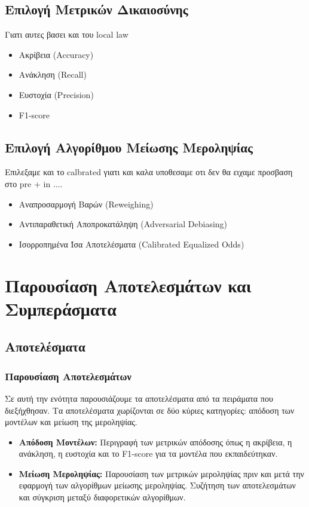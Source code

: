 \documentclass[12pt,twoside]{article}
\begin{document}
\subsection{Επιλογή Μετρικών Δικαιοσύνης}
Γιατι αυτες βασει και του local law
\begin{itemize}
    \item Ακρίβεια (Accuracy)
    \item Ανάκληση (Recall)
    \item Ευστοχία (Precision)
    \item F1-score
\end{itemize}

\subsection{Επιλογή Αλγορίθμου Μείωσης Μεροληψίας}
Επιλεξαμε και το calbrated γιατι και καλα υποθεσαμε οτι δεν θα ειχαμε προσβαση στο pre + in .... 
\begin{itemize}
    \item Αναπροσαρμογή Βαρών (Reweighing)
    \item Αντιπαραθετική Αποπροκατάληψη (Adversarial Debiasing)
    \item Ισορροπημένα Ίσα Αποτελέσματα (Calibrated Equalized Odds)
\end{itemize}


\newpage
\section{Παρουσίαση Αποτελεσμάτων και Συμπεράσματα}

\subsection{Αποτελέσματα}

\subsubsection{Παρουσίαση Αποτελεσμάτων}
Σε αυτή την ενότητα παρουσιάζουμε τα αποτελέσματα από τα πειράματα που διεξήχθησαν. Τα αποτελέσματα χωρίζονται σε δύο κύριες κατηγορίες: απόδοση των μοντέλων και μείωση της μεροληψίας.

\begin{itemize}
    \item \textbf{Απόδοση Μοντέλων:} Περιγραφή των μετρικών απόδοσης όπως η ακρίβεια, η ανάκληση, η ευστοχία και το F1-score για τα μοντέλα που εκπαιδεύτηκαν.
    \item \textbf{Μείωση Μεροληψίας:} Παρουσίαση των μετρικών μεροληψίας πριν και μετά την εφαρμογή των αλγορίθμων μείωσης μεροληψίας. Συζήτηση των αποτελεσμάτων και σύγκριση μεταξύ διαφορετικών αλγορίθμων.
\end{itemize}
\end{document}

